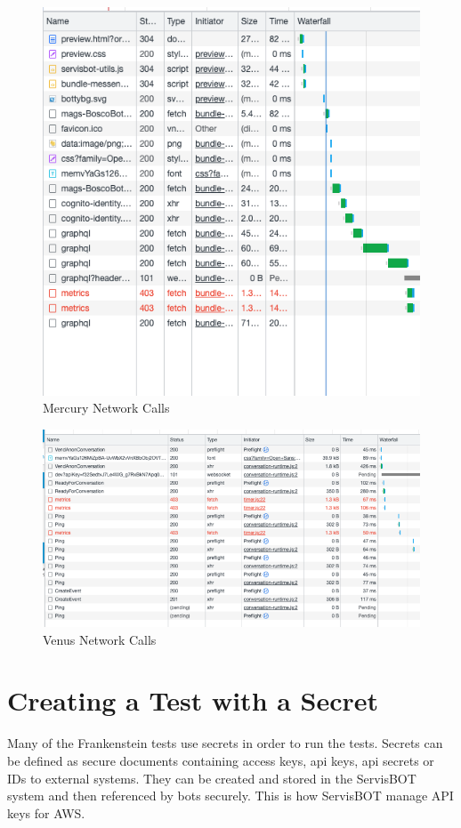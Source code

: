 \documentclass[12pt,a4paper,titlepage]{report}
\begin{document}
\begin{figure}[H]
 \centering
 \includegraphics[width=15cm]{./diagrams/mercury_network_calls.png}
 \caption{Mercury Network Calls}
\end{figure}

\begin{figure}[H]
 \centering
 \includegraphics[width=15cm]{./diagrams/venus_network_calls.png}
 \caption{Venus Network Calls}
\end{figure}

\section{Creating a Test with a Secret}
Many of the Frankenstein tests use secrets in order to run the tests. Secrets can be defined as secure documents containing access keys, api keys, api secrets or IDs to external systems. They can be created and stored in the ServisBOT system and then referenced by bots securely. 
This is how ServisBOT manage API keys for AWS\@.
\end{document}
